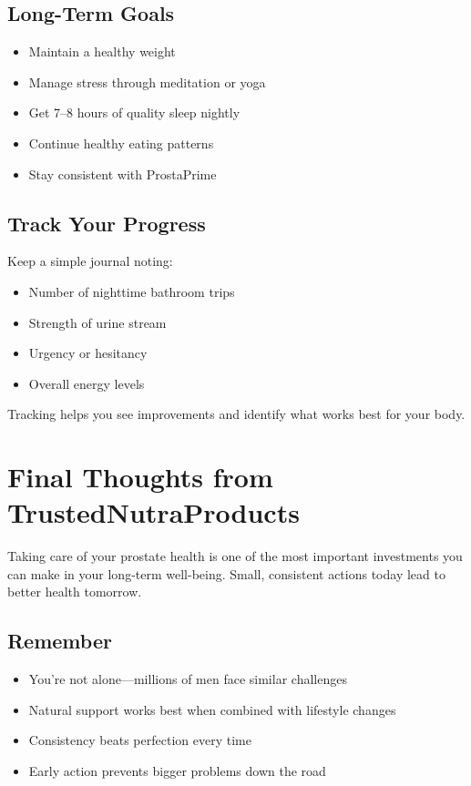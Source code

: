 \documentclass[11pt,oneside,openany]{book}
\begin{document}
\section*{Long-Term Goals}
\begin{itemize}[leftmargin=*]
\item[$\square$] Maintain a healthy weight
\item[$\square$] Manage stress through meditation or yoga
\item[$\square$] Get 7--8 hours of quality sleep nightly
\item[$\square$] Continue healthy eating patterns
\item[$\square$] Stay consistent with ProstaPrime
\end{itemize}

\section*{Track Your Progress}
Keep a simple journal noting:
\begin{itemize}[leftmargin=*]
\item Number of nighttime bathroom trips
\item Strength of urine stream
\item Urgency or hesitancy
\item Overall energy levels
\end{itemize}

Tracking helps you see improvements and identify what works best for your body.

\newpage


\chapter*{Final Thoughts from TrustedNutraProducts}

Taking care of your prostate health is one of the most important investments you can make in your long-term well-being. Small, consistent actions today lead to better health tomorrow.

\section*{Remember}
\begin{itemize}[leftmargin=*]
\item You're not alone---millions of men face similar challenges
\item Natural support works best when combined with lifestyle changes
\item Consistency beats perfection every time
\item Early action prevents bigger problems down the road
\end{itemize}
\end{document}
